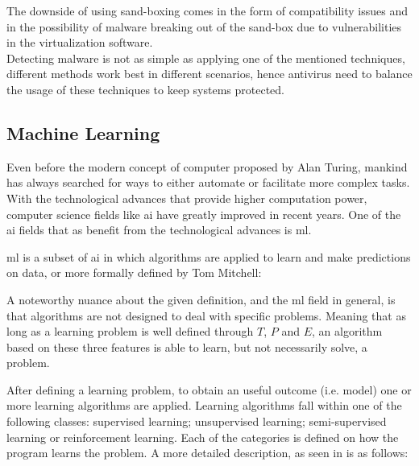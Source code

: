 \documentclass{llncs}
\begin{document}
The downside of using sand-boxing comes in the form of compatibility issues and in the possibility of malware breaking out of the sand-box due to vulnerabilities in the virtualization software.\\

Detecting malware is not as simple as applying one of the mentioned techniques, different methods work best in different scenarios, hence antivirus need to balance the usage of these techniques to keep systems protected.


\clearpage
\subsection{Machine Learning}

Even before the modern concept of computer proposed by Alan Turing, mankind has always searched for ways to either automate or facilitate more complex tasks. With the technological advances that provide higher computation power, computer science fields like \gls{ai} have greatly improved in recent years. One of the \gls{ai} fields that as benefit from the technological advances is \gls{ml}.

\gls{ml} is a subset of \gls{ai} in which algorithms are applied to learn and make predictions on data, or more formally defined by Tom Mitchell\cite{mitchell:ml}:\\

A noteworthy nuance about the given definition, and the \gls{ml} field in general, is that algorithms are not designed to deal with specific problems. Meaning that as long as a learning problem is well defined through $T$, $P$ and $E$, an algorithm based on these three features is able to learn, but not necessarily solve, a problem.

After defining a learning problem, to obtain an useful outcome (i.e. model) one or more learning algorithms are applied. Learning algorithms fall within one of the following classes: supervised learning; unsupervised learning; semi-supervised learning or reinforcement learning. Each of the categories is defined on how the program learns the problem. A more detailed description, as seen in \cite{norvig:ai} is as follows:
\end{document}
